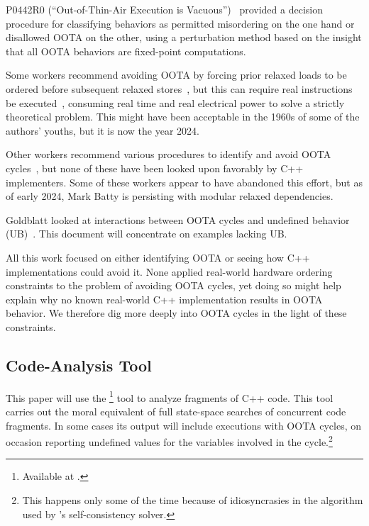 \documentclass[10]{article}
\begin{document}
P0442R0 (``Out-of-Thin-Air Execution is Vacuous'')~\cite{PaulEMcKenney2016OOTA}
provided a decision procedure for classifying behaviors as permitted
misordering on the one hand or disallowed OOTA on the other, using
a perturbation method based on the insight that all OOTA behaviors are
fixed-point computations.

Some workers recommend avoiding OOTA by forcing prior relaxed
loads to be ordered before subsequent relaxed
stores~\cite{Boehm:2014:OGA:2618128.2618134,HansBoehm2019OOTArevisitedAgain,Lahav:2017:RSC:3062341.3062352},
but this can require real instructions be
executed~\cite[Section 7.1]{Maranget2012TutorialARMPower},
consuming real time and real electrical power to solve a strictly
theoretical problem.
This might have been acceptable in the 1960s of some of the authors'
youths, but it is now the year 2024.

Other workers recommend various procedures to identify and avoid OOTA
cycles~\cite{Lahav:2017:RSC:3062341.3062352,Sinclair:2017:CAR:3079856.3080206,Lee:10.1145/3385412.3386010,MarkBatty2019ModularRelaxedDependenciesOOTA},
but none of these have been looked upon favorably by C++ implementers.
Some of these workers appear to have abandoned this effort, but as of
early 2024, Mark Batty is persisting with modular relaxed dependencies.

Goldblatt looked at interactions between OOTA cycles and
undefined behavior (UB)~\cite{DavidGoldblatt2019NoElegantOOTAfix}.
This document will concentrate on examples lacking UB.

All this work focused on either identifying OOTA or seeing how C++
implementations could avoid it.
None applied real-world hardware ordering constraints to the problem
of avoiding OOTA cycles,
yet doing so might help explain why no known real-world C++ implementation
results in OOTA behavior.
We therefore dig more deeply into OOTA cycles in the light
of these constraints.

\subsection{Code-Analysis Tool}
\label{sec:Code-Analysis Tool}

This paper will use the \footnote{
	Available at .}
tool to analyze fragments of C++ code.
This tool carries out the moral equivalent of full state-space searches
of concurrent code fragments.
In some cases its output will include executions with OOTA cycles,
on occasion reporting undefined values for the variables involved in
the cycle.\footnote{
	This happens only some of the time because of idiosyncrasies
	in the algorithm used by 's self-consistency solver.}
\end{document}
